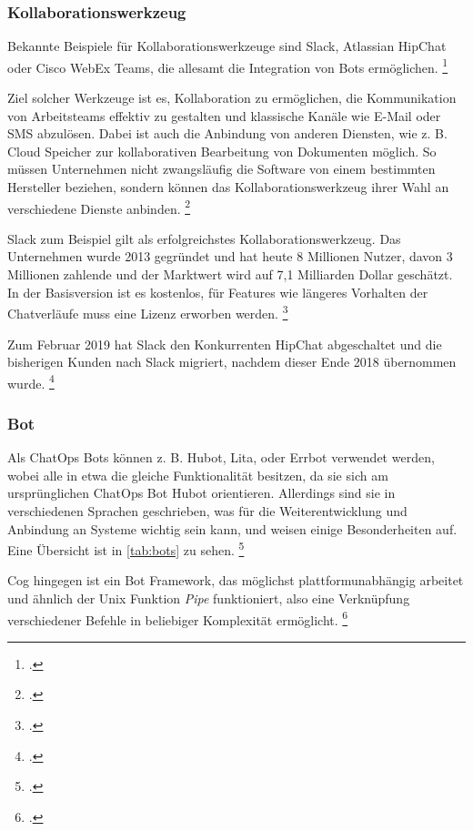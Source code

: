 \subsubsection{Kollaborationswerkzeug}
Bekannte Beispiele für Kollaborationswerkzeuge sind Slack, Atlassian HipChat oder Cisco WebEx Teams, die allesamt die Integration von Bots ermöglichen.
\footcite[Vgl.][o. \pno]{Zyane_2017_ChatOps}

Ziel solcher Werkzeuge ist es, Kollaboration zu ermöglichen, die Kommunikation von Arbeitsteams effektiv zu gestalten und klassische Kanäle wie E-Mail oder SMS abzulösen. Dabei ist auch die Anbindung von anderen Diensten, wie z. B. Cloud Speicher zur kollaborativen Bearbeitung von Dokumenten möglich. So müssen Unternehmen nicht zwangsläufig die Software von einem bestimmten Hersteller beziehen, sondern können das Kollaborationswerkzeug ihrer Wahl an verschiedene Dienste anbinden.
\footcite[Vgl.][o. \pno]{Koeltzsch_2019_Slack}

Slack zum Beispiel gilt als erfolgreichstes Kollaborationswerkzeug. Das Unternehmen wurde 2013 gegründet und hat heute 8 Millionen Nutzer, davon 3 Millionen zahlende und der Marktwert wird auf 7,1 Milliarden Dollar geschätzt. In der Basisversion ist es kostenlos, für Features wie längeres Vorhalten der Chatverläufe muss eine Lizenz erworben werden.
\footcite[Vgl.][o. \pno]{Koeltzsch_2019_Slack}

Zum Februar 2019 hat Slack den Konkurrenten HipChat abgeschaltet und die bisherigen Kunden nach Slack migriert, nachdem dieser Ende 2018 übernommen wurde.
\footcite[Vgl.][o. \pno]{Donath_2018_Hipchat_Uebernahme}

\subsubsection{Bot}
Als ChatOps Bots können z. B. Hubot, Lita, oder  Errbot verwendet werden, wobei alle in etwa die gleiche Funktionalität besitzen, da sie sich am ursprünglichen ChatOps Bot Hubot orientieren.
Allerdings sind sie in verschiedenen Sprachen geschrieben, was für die Weiterentwicklung und Anbindung an Systeme wichtig sein kann, und weisen einige Besonderheiten auf. Eine Übersicht ist in \autoref{tab:bots} zu sehen.
\footcite[Vgl.][o. \pno]{Zyane_2017_ChatOps}

Cog hingegen ist ein Bot Framework, das möglichst plattformunabhängig arbeitet und ähnlich der Unix Funktion \textit{Pipe} funktioniert, also eine Verknüpfung verschiedener Befehle in beliebiger Komplexität ermöglicht.
\footcite[Vgl.][o. \pno]{Zyane_2017_ChatOps}

